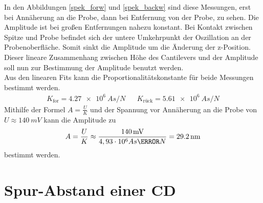 In den Abbildungen \ref{spek_forw} und \ref{spek_backw} sind diese Messungen, erst
bei Annäherung an die Probe, dann bei Entfernung von der Probe, zu sehen. Die 
Amplitude ist bei großen Entfernungen nahezu konstant. Bei Kontakt zwischen Spitze
und Probe befindet sich der untere Umkehrpunkt der Oszillation an der 
Probenoberfläche.
Somit sinkt die Amplitude um die Änderung der z-Position. Dieser lineare 
Zusammenhang zwischen Höhe des Cantilevers und der Amplitude soll nun zur 
Bestimmung der Amplitude benutzt werden.
\vspace{6pt}\\
Aus den linearen Fits kann die Proportionalitätskonstante für beide Messungen
bestimmt werden.
\begin{align*}
    K_{\text{for}} = \SI{4,27e6}{A s \per N} & & K_{\text{rück}} = 
    \SI{5,61e6}{A s \per N}
\end{align*}
Mithilfe der Formel $\displaystyle A = \frac{U}{K}$ und der Spannung vor Annäherung
an die Probe von $U \approx \SI{140}{mV}$ kann die Amplitude zu
\begin{align*}
    A = \frac{U}{K} \approx \frac{\SI{140}{mV}}{4,93 \cdot 10^6{A s \per N}} = \SI{29,2}{nm}
\end{align*}
bestimmt werden.

    \section{Spur-Abstand einer CD}

